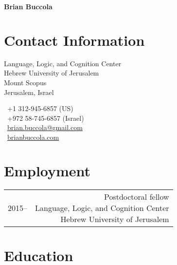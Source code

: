 \documentclass[11pt,letterpaper,twoside]{article}
\makeatletter
\newcommand{\bodywidth}{0.75}
\newenvironment{cvsection}{%
  \setlength{\extrarowheight}{1ex}
  \begin{longtable}[l]{@{} L R @{}}
}{%
  \end{longtable}
}
\makeatother
\begin{document}
\thispagestyle{first}

\begin{center}
  {\Huge\bfseries Brian Buccola}
\end{center}

\vspace{1em}

\section*{Contact Information}

\begin{minipage}[t]{0.63\textwidth}
  Language, Logic, and Cognition Center\\
  Hebrew University of Jerusalem\\
  Mount Scopus\\
  Jerusalem, Israel
\end{minipage}
\begin{minipage}[t]{0.36\textwidth}
  \Telefon\ +1 312-945-6857 {\footnotesize (US)}\\
  \Telefon\ +972 58-745-6857 {\footnotesize (Israel)}\\
  \Letter\ \href{mailto:brian.buccola@gmail.com}{\ttfamily brian.buccola@gmail.com}\\
  \Keyboard\ \href{http://brianbuccola.com/}{\ttfamily brianbuccola.com}
\end{minipage}

\section*{Employment}

\begin{cvsection}
  2015-- & \parbox[t]{\bodywidth\textwidth}{%
    Postdoctoral fellow\\
    Language, Logic, and Cognition Center\\
    Hebrew University of Jerusalem
  }\\
\end{cvsection}

\section*{Education}
\end{document}
